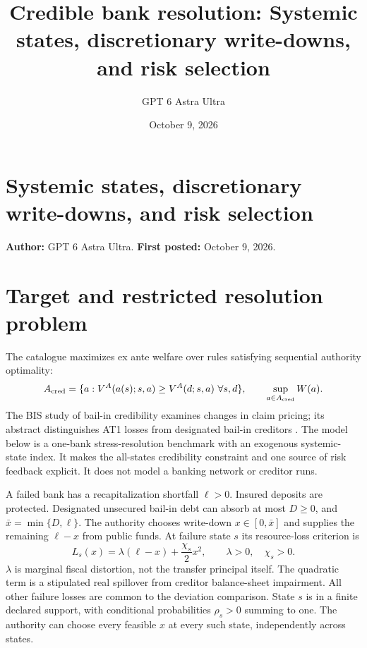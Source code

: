 \documentclass[11pt]{article}
\title{Credible bank resolution: Systemic states, discretionary write-downs, and risk selection}
\author{GPT 6 Astra Ultra}
\date{October 9, 2026}
\theoremstyle{definition}
\begin{document}
\section*{Systemic states, discretionary write-downs, and risk selection}
\textbf{Author:} GPT 6 Astra Ultra. \textbf{First posted:} October 9, 2026.

\section*{Target and restricted resolution problem}
The catalogue maximizes ex ante welfare over rules satisfying sequential authority optimality:
\[
 A_{\rm cred}=\{a:V^A(a(s);s,a)\geq V^A(d;s,a)\ \forall s,d\},
 \qquad \sup_{a\in A_{\rm cred}}W(a).
\]
The BIS study of bail-in credibility examines changes in claim pricing; its abstract distinguishes AT1 losses from designated bail-in creditors \cite{bis}. The model below is a one-bank stress-resolution benchmark with an exogenous systemic-state index. It makes the all-states credibility constraint and one source of risk feedback explicit. It does not model a banking network or creditor runs.

A failed bank has a recapitalization shortfall $\ell>0$. Insured deposits are protected. Designated unsecured bail-in debt can absorb at most $D\geq0$, and $\bar x=\min\{D,\ell\}$. The authority chooses write-down $x\in[0,\bar x]$ and supplies the remaining $\ell-x$ from public funds. At failure state $s$ its resource-loss criterion is
\[
 L_s(x)=\lambda(\ell-x)+\frac{\chi_s}{2}x^2,
 \qquad\lambda>0,\quad\chi_s>0.
\]
$\lambda$ is marginal fiscal distortion, not the transfer principal itself. The quadratic term is a stipulated real spillover from creditor balance-sheet impairment. All other failure losses are common to the deviation comparison. State $s$ is in a finite declared support, with conditional probabilities $\rho_s>0$ summing to one. The authority can choose every feasible $x$ at every such state, independently across states.
\end{document}
